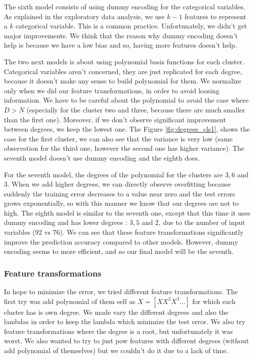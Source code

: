 \documentclass{article} %
\begin{document}
The sixth model consists of using dummy encoding for the categorical variables. As explained in the exploratory data analysis, we use $k-1$ features to represent a $k$ categorical variable. This is a common practice. Unfortunately, we didn't get major improvements. We think that the reason why dummy encoding doesn't help is because we have a low bias and so, having more features doesn't help.

The two next models is about using polynomial basis functions for each cluster. Categorical variables aren't concerned, they are just replicated for each degree, because it doesn't make any sense to build polynomial for them. We normalize only when we did our feature transformations, in order to avoid loosing information. We have to be careful about the polynomial to avoid the case where $D > N$ (especially for the cluster two and three, because there are much smaller than the first one). Moreover, if we don't observe significant improvement between degrees, we keep the lowest one. The Figure \ref{fig:degrees_cls1}, shows the case for the first cluster, we can also see that the variance is very low (same observation for the third one, however the second one has higher variance). The seventh model doesn't use dummy encoding and the eighth does.

For the seventh model, the degrees of the polynomial for the clusters are $3,6$ and $3$. When we add higher degrees, we can directly observe overfitting because suddenly the training error decreases to a value near zero and the test errors grows exponentially, so with this manner we know that our degrees are not to high. The eighth model is similar to the seventh one, except that this time it uses dummy encoding and has lower degrees : $3,5$ and $2$, due to the number of input variables ($92$ vs $76$). We can see that these feature transformations significantly improve the prediction accuracy compared to other models. However, dummy encoding seems to more efficient, and so our final model will be the seventh. 

\subsubsection{Feature transformations}

In hope to minimize the error, we tried different feature transformations. The first try was add polynomial of them self as $X = [X X^2 X^3 ...]$ for which each cluster has is own degree. We made vary the different degrees and also the lambdas in order to keep the lambda which minimize the test error. We also try feature transformations where the degree is a root, but unfortunately it was worst. We also wanted to try to just pow features with different degrees (without add polynomial of themselves) but we couldn't do it due to a lack of time.
\end{document}
